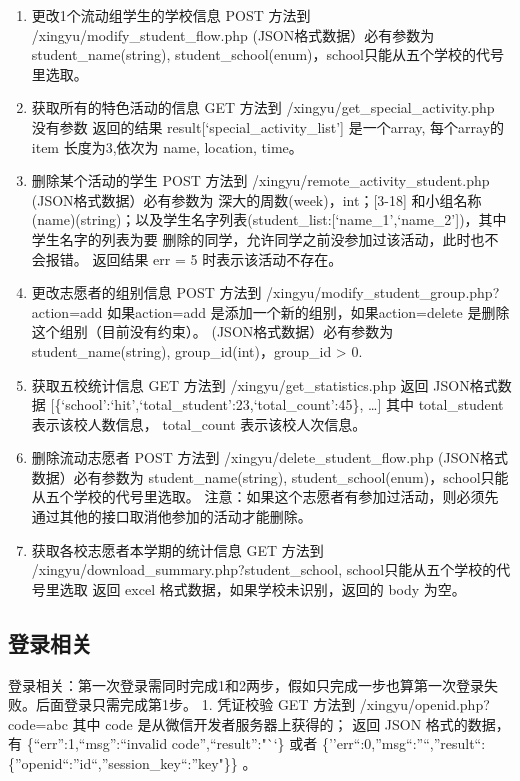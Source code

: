 \documentclass[]{article}
\begin{document}
\begin{enumerate}
\def\labelenumi{\arabic{enumi}.}
\setcounter{enumi}{7}
\item
  更改1个流动组学生的学校信息 POST 方法到
  /xingyu/modify\_student\_flow.php (JSON格式数据）必有参数为
  student\_name(string),
  student\_school(enum)，school只能从五个学校的代号里选取。
\item
  获取所有的特色活动的信息 GET 方法到 /xingyu/get\_special\_activity.php
  没有参数 返回的结果 result{[}`special\_activity\_list'{]} 是一个array,
  每个array的 item 长度为3,依次为 name, location, time。
\item
  删除某个活动的学生 POST 方法到 /xingyu/remote\_activity\_student.php
  (JSON格式数据）必有参数为 深大的周数(week)，int；{[}3-18{]}
  和小组名称(name)(string)；以及学生名字列表(student\_list:{[}`name\_1',`name\_2'{]})，其中学生名字的列表为要
  删除的同学，允许同学之前没参加过该活动，此时也不会报错。 返回结果 err
  = 5 时表示该活动不存在。
\item
  更改志愿者的组别信息 POST 方法到
  /xingyu/modify\_student\_group.php?action=add 如果action=add
  是添加一个新的组别，如果action=delete 是删除这个组别（目前没有约束）。
  (JSON格式数据）必有参数为 student\_name(string),
  group\_id(int)，group\_id \textgreater{} 0.
\item
  获取五校统计信息 GET 方法到 /xingyu/get\_statistics.php 返回
  JSON格式数据
  {[}\{`school':`hit',`total\_student':23,`total\_count':45\},
  \ldots{}{]} 其中 total\_student 表示该校人数信息， total\_count
  表示该校人次信息。
\item
  删除流动志愿者 POST 方法到 /xingyu/delete\_student\_flow.php
  (JSON格式数据）必有参数为 student\_name(string),
  student\_school(enum)，school只能从五个学校的代号里选取。
  注意：如果这个志愿者有参加过活动，则必须先通过其他的接口取消他参加的活动才能删除。
\item
  获取各校志愿者本学期的统计信息 GET 方法到
  /xingyu/download\_summary.php?student\_school,
  school只能从五个学校的代号里选取 返回 excel
  格式数据，如果学校未识别，返回的 body 为空。
\end{enumerate}

\hypertarget{ux767bux5f55ux76f8ux5173}{%
\subsection{登录相关}\label{ux767bux5f55ux76f8ux5173}}

登录相关：第一次登录需同时完成1和2两步，假如只完成一步也算第一次登录失败。后面登录只需完成第1步。
1. 凭证校验 GET 方法到 /xingyu/openid.php?code=abc 其中 code
是从微信开发者服务器上获得的； 返回 JSON 格式的数据，有
\{``err'':1,``msg'':``invalid code'',``result'':"``\} 或者
\{''err``:0,''msg``:''``,''result``:\{''openid``:''id``,''session\_key``:''key"\}\}
。
\end{document}
